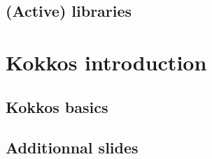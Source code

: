 \documentclass[9pt,hyperref={pdfpagemode=FullScreen,urlcolor=blue},xcolor=x11names]{beamer}
\begin{document}


\subsection{(Active) libraries}



\section{Kokkos introduction}

\subsection{Kokkos basics}



%

\subsection{Additionnal slides}



\end{document}
